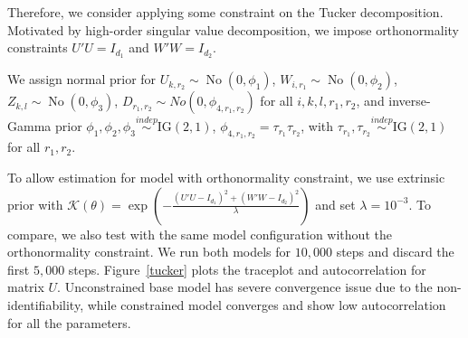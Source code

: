 \documentclass[10pt]{article}
\newcommand{\mc}[1]{\mathcal{#1}}
\DeclareMathOperator{\No}{No}
\DeclareMathOperator{\1}{\mathbbm{1}}
\begin{document}
Therefore, we consider applying some constraint on the Tucker decomposition. Motivated by high-order singular value decomposition, we impose orthonormality constraints $U'U=I_{d_1}$ and $W'W=I_{d_2}$.

We assign normal prior for $U_{k,r_2}\sim \No(0,\phi_{1})$, $W_{i,r_1}\sim \No(0,\phi_2)$, $Z_{k,l}\sim \No(0,\phi_3)$, $D_{r_1,r_2}\sim No(0, \phi_{4,r_1,r_2})$ for all $i,k,l,r_1,r_2$, and inverse-Gamma prior $\phi_1,\phi_2,\phi_3\stackrel{indep}{\sim} \text{IG}(2,1)$, $\phi_{4,r_1,r_2}= \tau_{r_1}\tau_{r_2}$, with $\tau_{r_1},\tau_{r_2}\stackrel{indep}{\sim} \text{IG}(2,1)$ for all $r_1,r_2$.


To allow estimation for model with orthonormality constraint, we use extrinsic prior with $\mc K(\theta) = \exp( - \frac{(U'U-I_{d_1})^2 + (W'W-I_{d_2})^2  }{\lambda})$ and set $\lambda=10^{-3}$. To compare, we also test with the same model configuration without the orthonormality constraint. We run both models for $10,000$ steps and discard the first $5,000$ steps. Figure~\ref{tucker} plots the traceplot and autocorrelation for matrix $U$. Unconstrained base model has severe convergence issue due to the non-identifiability, while constrained model converges and show low autocorrelation for all the parameters.
\end{document}

